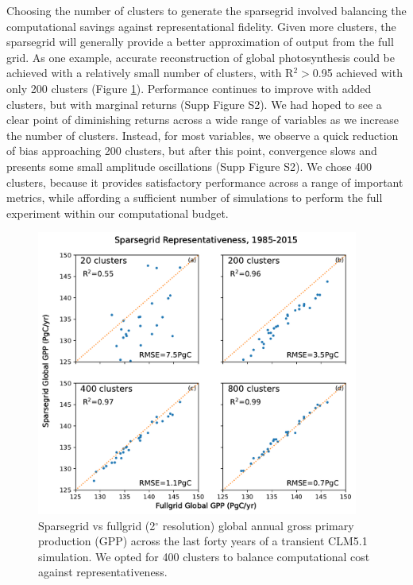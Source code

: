 \documentclass[draft]{agujournal2019}
\begin{document}
Choosing the number of clusters to generate the sparsegrid involved balancing the computational savings against representational fidelity. Given more clusters, the sparsegrid will generally provide a better approximation of output from the full grid. As one example, accurate reconstruction of global photosynthesis could be achieved with a relatively small number of clusters, with R$^2>$0.95 achieved with only 200 clusters (Figure \ref{fig:sg}).
Performance continues to improve with added clusters, but with marginal returns (Supp Figure S2).
We had hoped to see a clear point of diminishing returns across a wide range of variables as we increase the number of clusters. Instead, for most variables, we observe a quick reduction of bias approaching 200 clusters, but after this point, convergence slows and presents some small amplitude oscillations (Supp Figure S2). We chose 400 clusters, because it provides satisfactory performance across a range of important metrics, while affording a sufficient number of simulations to perform the full experiment within our computational budget.
\begin{figure}[h]
\centering
\includegraphics[width=25pc]{../figs/main/sparsegrid_gpp.pdf}
\caption{Sparsegrid vs fullgrid (2$^{\circ}$ resolution) global annual gross primary production (GPP) across the last forty years of a transient CLM5.1 simulation. We opted for 400 clusters to balance computational cost against representativeness.}
\label{fig:sg}
\end{figure}
\end{document}
